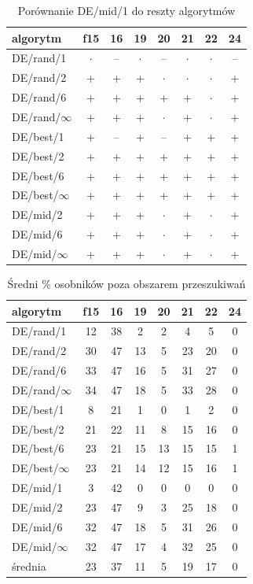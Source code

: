 \documentclass[a4paper,onecolumn,oneside,11pt,wide,floatssmall]{mwrep}
\theoremstyle{definition}
\theoremstyle{plain}%
\theoremstyle{remark}
\begin{document}
\begin{table}[H]
\centering
\begin{tabular}{ l | c | c | c | c | c | c | c }
algorytm         &f15& 16& 19& 20& 21& 22& 24 \\ \hline
DE/rand/1	 & $\cdot$ & -- & $\cdot$ & -- & $\cdot$ & $\cdot$ & -- \\
DE/rand/2	 & + & + & + & $\cdot$ & $\cdot$ & $\cdot$ & + \\
DE/rand/6	 & + & + & + & + & + & $\cdot$ & + \\
DE/rand/$\infty$	 & + & + & + & $\cdot$ & + & $\cdot$ & + \\
DE/best/1	 & + & -- & + & -- & + & + & + \\
DE/best/2	 & + & + & + & + & + & + & + \\
DE/best/6	 & + & + & + & + & + & + & + \\
DE/best/$\infty$	 & + & + & + & + & + & + & + \\
DE/mid/2	 & + & + & + & $\cdot$ & + & $\cdot$ & + \\
DE/mid/6	 & + & + & + & $\cdot$ & + & $\cdot$ & + \\
DE/mid/$\infty$	 & + & + & + & $\cdot$ & + & $\cdot$ & + \\
\end{tabular}
\caption{Porównanie DE/mid/1 do reszty algorytmów}
\end{table}

\begin{table}[H]
\centering
\begin{tabular}{ l | c | c | c | c | c | c | c }
algorytm         &f15& 16& 19& 20& 21& 22& 24 \\ \hline
DE/rand/1	 & 12 & 38 & 2 & 2 & 4 & 5 & 0   \\
DE/rand/2	 & 30 & 47 & 13 & 5 & 23 & 20 & 0  \\
DE/rand/6	 & 33 & 47 & 16 & 5 & 31 & 27 & 0     \\
DE/rand/$\infty$ & 34 & 47 & 18 & 5 & 33 & 28 & 0  \\
DE/best/1	 & 8 & 21 & 1 & 0 & 1 & 2 & 0      \\
DE/best/2	 & 21 & 22 & 11 & 8 & 15 & 16 & 0   \\
DE/best/6	 & 23 & 21 & 15 & 13 & 15 & 15 & 1      \\
DE/best/$\infty$ & 23 & 21 & 14 & 12 & 15 & 16 & 1 \\
DE/mid/1         & 3 & 42 & 0 & 0 & 0 & 0 & 0  \\
DE/mid/2	 & 23 & 47 & 9 & 3 & 25 & 18 & 0  \\
DE/mid/6	 & 32 & 47 & 18 & 5 & 31 & 26 & 0  \\
DE/mid/$\infty$	 & 32 & 47 & 17 & 4 & 32 & 25 & 0 \\ \hline
średnia          & 23 & 37 & 11 & 5 & 19 & 17 & 0 \\  
\end{tabular}
\caption{Średni \% osobników poza obszarem przeszukiwań}
\end{table}
\end{document}
